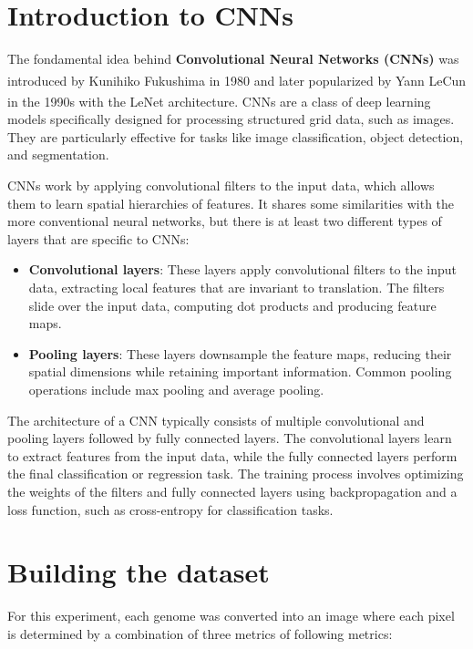 \section{Introduction to CNNs}
\label{sec:intro_cnn}

The fondamental idea behind \textbf{Convolutional Neural Networks (CNNs)} was introduced by Kunihiko Fukushima\textsuperscript{\cite{Fukushima-1987}}
in 1980 and later popularized by Yann LeCun in the 1990s with the LeNet architecture\textsuperscript{\cite{Lecun-et-al-1998}}. CNNs are a class of
deep learning models specifically designed for processing structured grid data, such as images. They are particularly effective for
tasks like image classification, object detection, and segmentation.

CNNs work by applying convolutional filters to the input data, which allows them to learn spatial hierarchies of features.
It shares some similarities with the more conventional neural networks, but there is at least two different types
of layers that are specific to CNNs:

\begin{itemize}
	\item \textbf{Convolutional layers}: These layers apply convolutional filters to the input data, extracting local features
	      that are invariant to translation. The filters slide over the input data, computing dot products and producing feature maps.
	\item \textbf{Pooling layers}: These layers downsample the feature maps, reducing their spatial dimensions while retaining important
	      information. Common pooling operations include max pooling and average pooling.
\end{itemize}

The architecture of a CNN typically consists of multiple convolutional and pooling layers followed by fully connected layers.
The convolutional layers learn to extract features from the input data, while the fully connected layers perform the final classification
or regression task. The training process involves optimizing the weights of the filters and fully connected layers using backpropagation
and a loss function, such as cross-entropy for classification tasks.

\section{Building the dataset}
\label{sec:building_dataset}

For this experiment, each genome was converted into an image where each pixel is determined by a combination of three metrics of following
metrics:

